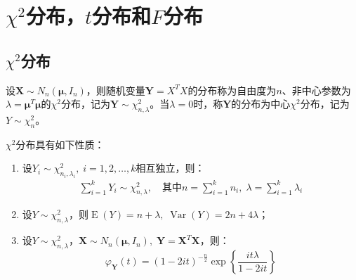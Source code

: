 \section{$\chi^2$分布，$t$分布和$F$分布}

\subsection{$\chi^2$分布}
\begin{definition}
	设$\mathbf{X}\sim N_n(\boldsymbol{\mu}, I_n)$，则随机变量$\mathbf{Y}=X^TX$的分布称为自由度为$n$、非中心参数为$\lambda=\boldsymbol{\mu}^T\boldsymbol{\mu}$的$\chi^2$分布，记为$\mathbf{Y}\sim \chi^2_{n,\lambda}$。当$\lambda=0$时，称$\mathbf{Y}$的分布为中心$\chi^2$分布，记为$Y\sim\chi_n^2$。
\end{definition}
\begin{property}\label{prop:Chi2Distribution}
	$\chi^2$分布具有如下性质：
	\begin{enumerate}
		\item 设$Y_i\sim\chi_{n_i,\lambda_i}^2,\;i=1,2,\dots,k$相互独立，则：
		\begin{gather*}
			\sum_{i=1}^{k}Y_i\sim\chi_{n,\lambda}^2,\quad\text{其中}
			n=\sum_{i=1}^{k}n_i,\;\lambda=\sum_{i=1}^{k}\lambda_i
		\end{gather*}
		\item 设$Y\sim\chi_{n,\lambda}^2$，则$\operatorname{E}(Y)=n+\lambda,\;\operatorname{Var}(Y)=2n+4\lambda$；
		\item 设$Y\sim\chi_{n,\lambda}^2$，$\mathbf{X}\sim N_n(\boldsymbol{\mu},I_n),\;\mathbf{Y}=\mathbf{X}^T\mathbf{X}$，则：
		\begin{equation*}
			\varphi_{\mathbf{Y}}(t)=(1-2it)^{-\frac{n}{2}}\exp\left\{\frac{it\lambda}{1-2it}\right\}
		\end{equation*}
	\end{enumerate}
\end{property}
